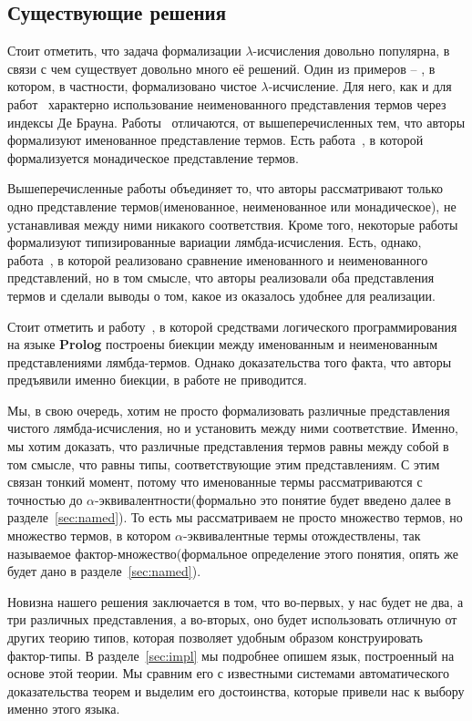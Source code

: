 \subsection{Существующие решения}

Стоит отметить, что задача формализации $\lambda$-исчисления довольно популярна, в связи с чем существует довольно много её решений. Один из примеров -- \cite{lambdaForm}, в котором, в частности, формализовано чистое $\lambda$-исчисление. Для него, как и для работ~\cite{shankar1988mechanical, altenkirch1993formalization, barras1996coq, nipkow1996more, huet1994residual} характерно использование неименованного представления термов через индексы Де Брауна. Работы~\cite{mckinna1999some, coquand1996algorithm, gabbay1999new, gordon1996five, sato1983theory, stoughton1988substitution} отличаются, от вышеперечисленных тем, что авторы формализуют именованное представление термов. Есть работа~\cite{altenkirch1999monadic}, в которой формализуется монадическое представление термов.

Вышеперечисленные работы объединяет то, что авторы рассматривают только одно представление термов(именованное, неименованное или монадическое), не устанавливая между ними никакого соответствия. Кроме того, некоторые работы формализуют типизированные вариации лямбда-исчисления. Есть, однако, работа~\cite{berghofer2007head}, в которой реализовано сравнение именованного и неименованного представлений, но в том смысле, что авторы реализовали оба представления термов и сделали выводы о том, какое из оказалось удобнее для реализации.

Стоит отметить и работу~\cite{tarau2015logic}, в которой средствами логического программирования на языке \textbf{Prolog} построены биекции между именованным и неименованным представлениями лямбда-термов. Однако доказательства того факта, что авторы предъявили именно биекции, в работе не приводится.

Мы, в свою очередь, хотим не просто формализовать различные представления чистого лямбда-исчисления, но и установить между ними соответствие. Именно, мы хотим доказать, что различные представления термов равны между собой в том смысле, что равны типы, соответствующие этим представлениям. С этим связан тонкий момент, потому что именованные термы рассматриваются с точностью до $\alpha$-эквивалентности(формально это понятие будет введено далее в разделе~\ref{sec:named}). То есть мы рассматриваем не просто множество термов, но множество термов, в котором $\alpha$-эквивалентные термы отождествлены, так называемое фактор-множество(формальное определение этого понятия, опять же будет дано в разделе~\ref{sec:named}).

Новизна нашего решения заключается в том, что во-первых, у нас будет не два, а три различных представления, а во-вторых, оно будет использовать отличную от других теорию типов, которая позволяет удобным образом конструировать фактор-типы. В разделе~\ref{sec:impl} мы подробнее опишем язык, построенный на основе этой теории. Мы сравним его с известными системами автоматического доказательства теорем и выделим его достоинства, которые привели нас к выбору именно этого языка.
